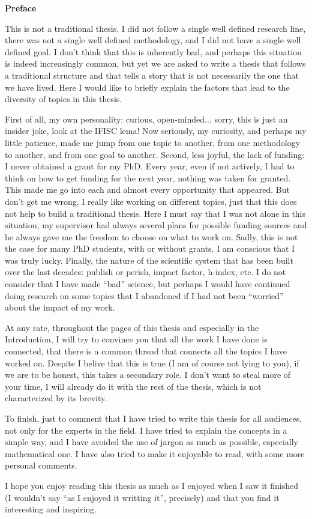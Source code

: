 \pagebreak
\thispagestyle{empty}

\begin{center}
    \textbf{\Large Preface}
\end{center}

This is not a traditional thesis. I did not follow a single well defined
research line, there was not a single well defined methodology, and I did not
have a single well defined goal. I don't think that this is inherently bad, and
perhaps this situation is indeed increasingly common, but yet we are asked to
write a thesis that follows a traditional structure and that tells a story that
is not necessarily the one that we have lived. Here I would like to briefly
explain the factors that lead to the diversity of topics in this thesis.

First of all, my own personality: curious, open-minded... sorry, this is just
an insider joke, look at the IFISC lema! Now seriously, my curiosity, and
perhaps my little patience, made me jump from one topic to another, from one
methodology to another, and from one goal to another. Second, less joyful,
the lack of funding: I never obtained a grant for my PhD. Every year, even if
not actively, I had to think on how to get funding for the next year, nothing
was taken for granted. This made me go into each and almost every opportunity
that appeared. But don't get me wrong, I really like working on different
topics, just that this does not help to build a traditional thesis. Here I must
say that I was not alone in this situation, my supervisor had always several
plans for possible funding sources and he always gave me the freedom to choose
on what to work on. Sadly, this is not the case for many PhD students, with or
without grants. I am conscious that I was truly lucky. Finally, the nature of
the scientific system that has been built over the last decades:
publish or perish, impact factor, h-index, etc. I do not consider that I
have made ``bad'' science, but perhaps I would have continued doing research on
some topics that I abandoned if I had not been ``worried'' about the impact of
my work.

At any rate, throughout the pages of this thesis and especially in the
Introduction, I will try to convince you that all the work I have done is
connected, that there is a common thread that connects all the topics I have
worked on. Despite I belive that this is true (I am of course not lying to
you), if we are to be honest, this takes a secondary role. I don't want to
steal more of your time, I will already do it with the rest of the thesis,
which is not characterized by its brevity.

To finish, just to comment that I have tried to write this thesis for all
audiences, not only for the experts in the field. I have tried to explain the
concepts in a simple way, and I have avoided the use of jargon as much as
possible, especially mathematical one. I have also tried to make it enjoyable
to read, with some more personal comments.

I hope you enjoy reading this thesis as much as I enjoyed when I saw it
finished (I wouldn't say ``as I enjoyed it writting it'', precisely) and that
you find it interesting and inspiring.

\vfill